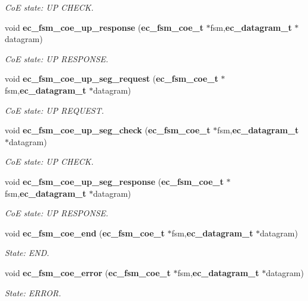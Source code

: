 \begin{DoxyCompactItemize}
\begin{DoxyCompactList}\small\item\em Co\-E state\-: U\-P C\-H\-E\-C\-K. \end{DoxyCompactList}\item 
void {\bf ec\-\_\-fsm\-\_\-coe\-\_\-up\-\_\-response} ({\bf ec\-\_\-fsm\-\_\-coe\-\_\-t} $\ast$fsm,{\bf ec\-\_\-datagram\-\_\-t} $\ast$datagram)
\begin{DoxyCompactList}\small\item\em Co\-E state\-: U\-P R\-E\-S\-P\-O\-N\-S\-E. \end{DoxyCompactList}\item 
void {\bf ec\-\_\-fsm\-\_\-coe\-\_\-up\-\_\-seg\-\_\-request} ({\bf ec\-\_\-fsm\-\_\-coe\-\_\-t} $\ast$fsm,{\bf ec\-\_\-datagram\-\_\-t} $\ast$datagram)
\begin{DoxyCompactList}\small\item\em Co\-E state\-: U\-P R\-E\-Q\-U\-E\-S\-T. \end{DoxyCompactList}\item 
void {\bf ec\-\_\-fsm\-\_\-coe\-\_\-up\-\_\-seg\-\_\-check} ({\bf ec\-\_\-fsm\-\_\-coe\-\_\-t} $\ast$fsm,{\bf ec\-\_\-datagram\-\_\-t} $\ast$datagram)
\begin{DoxyCompactList}\small\item\em Co\-E state\-: U\-P C\-H\-E\-C\-K. \end{DoxyCompactList}\item 
void {\bf ec\-\_\-fsm\-\_\-coe\-\_\-up\-\_\-seg\-\_\-response} ({\bf ec\-\_\-fsm\-\_\-coe\-\_\-t} $\ast$fsm,{\bf ec\-\_\-datagram\-\_\-t} $\ast$datagram)
\begin{DoxyCompactList}\small\item\em Co\-E state\-: U\-P R\-E\-S\-P\-O\-N\-S\-E. \end{DoxyCompactList}\item 
void {\bf ec\-\_\-fsm\-\_\-coe\-\_\-end} ({\bf ec\-\_\-fsm\-\_\-coe\-\_\-t} $\ast$fsm,{\bf ec\-\_\-datagram\-\_\-t} $\ast$datagram)
\begin{DoxyCompactList}\small\item\em State\-: E\-N\-D. \end{DoxyCompactList}\item 
void {\bf ec\-\_\-fsm\-\_\-coe\-\_\-error} ({\bf ec\-\_\-fsm\-\_\-coe\-\_\-t} $\ast$fsm,{\bf ec\-\_\-datagram\-\_\-t} $\ast$datagram)
\begin{DoxyCompactList}\small\item\em State\-: E\-R\-R\-O\-R. \end{DoxyCompactList}\item 

\end{DoxyCompactItemize}
